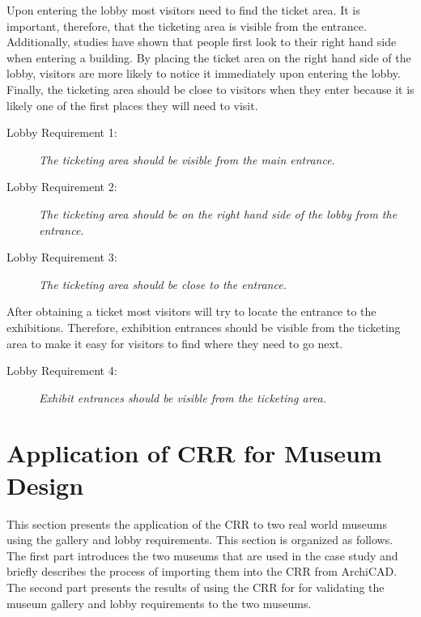 \documentclass[12pt]{ucthesis}
\begin{document}
Upon entering the lobby most visitors need to find the ticket area. It is important, therefore, that the ticketing area is visible from the entrance. Additionally, studies have shown that people first look to their right hand side when entering a building. By placing the ticket area on the right hand side of the lobby, visitors are more likely to notice it immediately upon entering the lobby. Finally, the ticketing area should be close to visitors when they enter because it is likely one of the first places they will need to visit.
\begin{description}
\item[Lobby Requirement 1:] \emph{The ticketing area should be visible from the main entrance.}
\item[Lobby Requirement 2:] \emph{The ticketing area should be on the right hand side of the lobby from the entrance.}
\item[Lobby Requirement 3:] \emph{The ticketing area should be close to the entrance.}
\end{description}

After obtaining a ticket most visitors will try to locate the entrance to the exhibitions. Therefore, exhibition entrances should be visible from the ticketing area to make it easy for visitors to find where they need to go next. 
\begin{description}
\item[Lobby Requirement 4:] \emph{Exhibit entrances should be visible from the ticketing area.}
\end{description}




\section{Application of CRR for Museum Design}
This section presents the application of the CRR to two real world museums using the gallery and lobby requirements. This section is organized as follows. The first part introduces the two museums that are used in the case study and briefly describes the process of importing them into the CRR from ArchiCAD. The second part presents the results of using the CRR for for validating the museum gallery and lobby requirements to the two museums.
\end{document}
